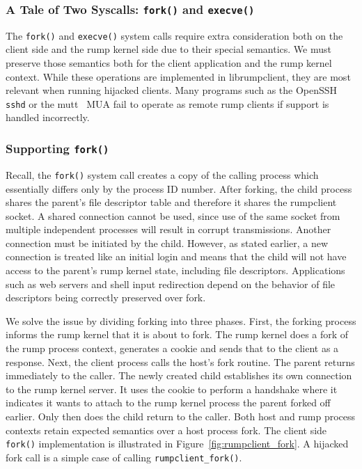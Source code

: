 \subsubsection{A Tale of Two Syscalls: \texttt{fork()} and \texttt{execve()}}

The \texttt{fork()} and \texttt{execve()} system calls require
extra consideration both on the client side and the rump kernel
side due to their special semantics.  We must preserve those
semantics both for the client application and the rump kernel
context.  While these operations are implemented in librumpclient, they
are most relevant when running hijacked clients.  Many programs such as
the OpenSSH~\cite{openssh} \texttt{sshd} or the mutt~\cite{mutt} MUA
fail to operate as remote rump clients if support is handled
incorrectly.

\subsubsection*{Supporting \texttt{fork()}}

Recall, the \verb+fork()+ system call creates a copy of the calling
process which essentially differs only by the process ID number.
After forking, the child process shares the
parent's file descriptor table and therefore it shares the rumpclient socket.  A shared connection cannot be used, since use of
the same socket from multiple independent processes will result in
corrupt transmissions.  Another connection must be initiated by the child.
However, as stated earlier, a new connection is
treated like an initial login and means that the child will not
have access to the parent's rump kernel state, including file
descriptors.  Applications such as web servers and shell input
redirection depend on the behavior of file descriptors being correctly
preserved over fork.

We solve the issue by dividing forking into three phases.  First,
the forking process informs the rump kernel that it is about to
fork.  The rump kernel does a fork of the rump process context,
generates a cookie and sends that to the client as a response.
Next, the client process calls the host's fork routine.  The parent
returns immediately to the caller.  The newly created child
establishes its own connection to the rump kernel server.  It uses
the cookie to perform a handshake where it indicates it wants to
attach to the rump kernel process the parent forked off earlier.
Only then does the child return to the caller.  Both host
and rump process contexts retain expected semantics over a host
process fork.  The client side \texttt{fork()} implementation is
illustrated in Figure~\ref{fig:rumpclient_fork}.  A hijacked fork
call is a simple case of calling \verb+rumpclient_fork()+.

